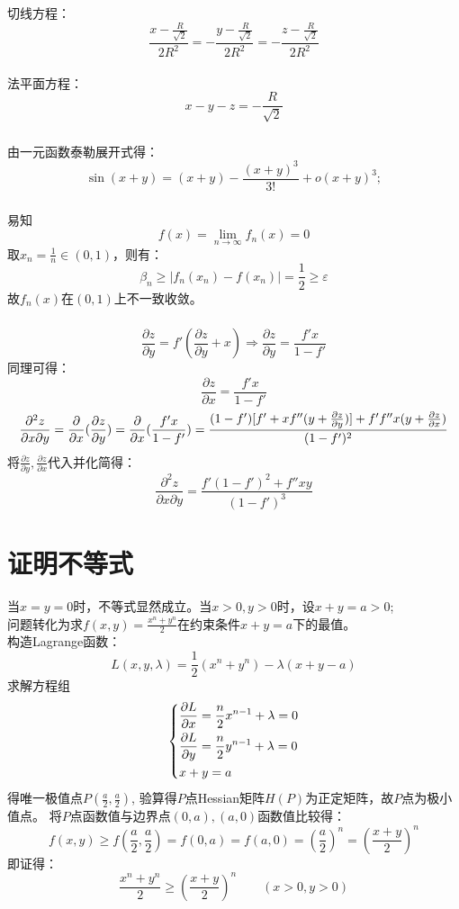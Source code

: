 \documentclass[UTF8]{ctexart}
\begin{document}
切线方程：\[\frac{x-\frac{R}{\sqrt{2}}}{2R^2}=-\frac{y-\frac{R}{\sqrt{2}}}{2R^2}=-\frac{z-\frac{R}{\sqrt{2}}}{2R^2}\]\\
法平面方程：\[x-y-z=-\frac{R}{\sqrt{2}}\]
\section{}
由一元函数泰勒展开式得：\\
\[\sin(x+y)=(x+y)-\frac{(x+y)^3}{3!}+o(x+y)^3;\]
\section{}
易知\[
    f(x)=\lim_{n \to \infty}  f_n(x)=0\]取$x_n=\frac{1}{n}\in (0,1) $，则有：\[\beta_n\geq|f_n(x_n)-f(x_n)|=\frac{1}{2}\geq\varepsilon\]
故$f_n(x)$在$(0,1)$上不一致收敛。
\section{}
\[\frac{\partial   z }{\partial  y }=f'(\frac{\partial  z }{\partial  y }+x)\Rightarrow \frac{\partial  z }{\partial  y }=\frac{f'x}{1-f'}\]
同理可得：\[\frac{\partial  z }{\partial  x }=\frac{f'x}{1-f'}\]
\[\frac{\partial^2  z }{\partial x \partial  y }=\frac{\partial}{\partial x}(\frac{\partial  z }{\partial  y })=\frac{\partial}{\partial x}(\frac{f'x}{1-f'})=\frac{(1-f')[f'+xf''(y+\frac{\partial  z }{\partial  y })]+f'f''x(y+\frac{\partial  z }{\partial  x })}{(1-f')^2}\\\]
将$\frac{\partial   z }{\partial  y },\frac{\partial  z }{\partial  x }$代入并化简得：
\[\frac{\partial^2  z }{\partial x \partial  y }=\frac{f'(1-f')^2+f''xy}{(1-f')^3}\]
\part{证明不等式}
当$x=y=0$时，不等式显然成立。当$x>0,y>0$时，设$x+y=a>0$;\\
问题转化为求$f(x,y)=\frac{x^n+y^n}{2}$在约束条件$x+y=a$下的最值。\\
构造Lagrange函数：\[
    L(x,y,\lambda )=\frac12(x^n+y^n)-\lambda(x+y-a)\]
求解方程组
\[
    \left\{\begin{lgathered}
        \frac{\partial L}{\partial x}=\frac{n}{2}x^{n-1}+\lambda=0\\
        \frac{\partial L}{\partial y}=\frac{n}{2}y^{n-1}+\lambda=0\\
        x+y=a\\
    \end{lgathered}\right.\]
得唯一极值点$P (\frac a 2,\frac{a}{2})$,
验算得$P $点Hessian矩阵$H (P)$为正定矩阵，故$P $点为极小值点。
将$P $点函数值与边界点$(0,a),(a,0)$函数值比较得：
\[
    f(x,y)\geq f(\frac{a}{2},\frac{a}{2})=f(0,a)=f(a,0)=(\frac{a}{2})^n=(\frac{x+y}{2})^n\]
即证得：\[\frac{x^n+y^n}{2}\geq (\frac{x+y}{2})^n\qquad (x>0,y>0)\]
\end{document}
